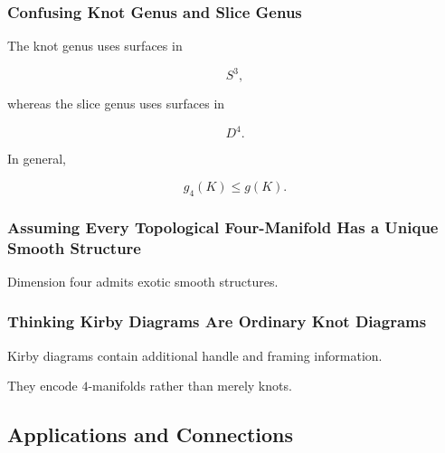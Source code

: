 \subsubsection{Confusing Knot Genus and Slice Genus}

The knot genus uses surfaces in

\[
S^3,
\]

whereas the slice genus uses surfaces in

\[
D^4.
\]

In general,

\[
g_4(K)\leq g(K).
\]

\subsubsection{Assuming Every Topological Four-Manifold Has a Unique Smooth Structure}

Dimension four admits exotic smooth structures.

\subsubsection{Thinking Kirby Diagrams Are Ordinary Knot Diagrams}

Kirby diagrams contain additional handle and framing information.

They encode \(4\)-manifolds rather than merely knots.

\subsection{Applications and Connections}
\label{subsec:low-dimensional-applications}

